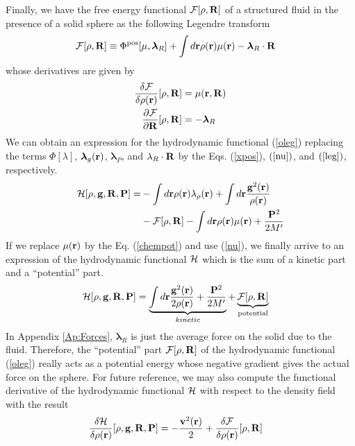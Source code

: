 \documentclass[b5paper,openright,11pt]{book}
\newcommand{\Pendiente}[1]{{\color{green}#1}} %
\begin{document}
Finally, we have the free energy functional ${\cal  F}[\rho,{\bf R}]$ of a structured fluid in the presence of a solid sphere as the following Legendre transform
\begin{align}
  {\cal F}[\rho,{\bf R}]&\equiv  \Phi^{\rm pos}[\mu,\boldsymbol{\lambda}_R]
+
\int d{\bf r}\rho({\bf r})\mu({\bf r})-\boldsymbol{\lambda}_R\cdot{\bf R}
\label{leg}
\end{align}
whose derivatives are given by 
\begin{align}
   \frac{\delta {\cal F}}{\delta\rho({\bf r})}[\rho,{\bf R}] &=\mu({\bf r},{\bf R})
\nonumber\\
   \frac{\partial {\cal F}}{\partial{\bf R}}[\rho,{\bf R}] &=-\boldsymbol{\lambda}_R
\label{Fd2}
\end{align}
We can obtain an expression for the  hydrodynamic functional (\ref{oleg}) replacing the terms $\Phi[\lambda]$, $\boldsymbol{\lambda}_g({\bf r})$, $\boldsymbol{\lambda}_P$, and $\lambda_R\cdot{\bf R}$ by the Eqs. (\ref{xpos}), $(\ref{nu})$, and $(\ref{leg})$, respectively. 
\begin{align}
  {\cal H}[\rho,{\bf g},{\bf R},{\bf P}] =& 
  -\int d{\bf r} \rho({\bf r})\lambda_{\rho}({\bf r}) 
  +\int d{\bf r}\frac{{\bf g}^2({\bf r})}{\rho({\bf r})} 
  \nonumber\\
  &- {\cal F}[\rho,{\bf R}] -\int d{\bf r}\rho({\bf r})\mu({\bf r}) + \frac{{\bf P}^2}{2M'}
\end{align}
If we replace $\mu({\bf r})$ by the Eq. (\ref{chempot}) and use (\ref{nu}), we finally arrive to an expression of the hydrodynamic functional ${\cal H}$ which is the sum of a kinetic part and a ``potential'' part. 
\begin{align}
  {\cal H}[\rho,{\bf g},{\bf R},{\bf P}] &=   
  \underbrace{\int d{\bf r}\frac{{\bf g}^2({\bf r})}{2\rho({\bf r})} +\frac{{\bf P}^2}{2M'}}_{kinetic}
  +\underbrace{{\cal F}[\rho,{\bf R}]}_{\rm potential}
\label{oleg2}
\end{align}
In \Pendiente{Appendix \ref{Ap:Forces}}, $\boldsymbol{\lambda}_R$
is just the  average force on the solid due  to the fluid.  Therefore,
the ``potential''  part ${\cal  F}[\rho,{\bf R}]$ of  the hydrodynamic
functional  (\ref{oleg})  really  acts  as a  potential  energy  whose
negative gradient  gives the actual  force on the sphere.   For future
reference,  we  may also  compute  the  functional derivative  of  the
hydrodynamic functional ${\cal  H}$ with respect to  the density field
with the result
\begin{align}
  \frac{\delta {\cal H}}{\delta\rho({\bf r})}[\rho,{\bf g},{\bf R},{\bf P}] &=    
-\frac{{\bf v}^2({\bf r})}{2}+  \frac{\delta {\cal F}}{\delta\rho({\bf r})}[\rho,{\bf R}]
\end{align}
\end{document}
